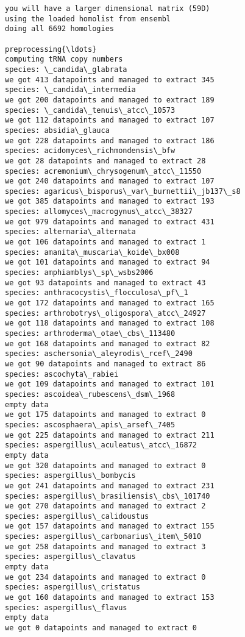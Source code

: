 \documentclass[11pt]{article}
\begin{document}
    \begin{Verbatim}[commandchars=\\\{\}]
you will have a larger dimensional matrix (59D)
using the loaded homolist from ensembl
doing all 6692 homologies
 
preprocessing{\ldots}
computing tRNA copy numbers
species: \_candida\_glabrata
we got 413 datapoints and managed to extract 345
species: \_candida\_intermedia
we got 200 datapoints and managed to extract 189
species: \_candida\_tenuis\_atcc\_10573
we got 112 datapoints and managed to extract 107
species: absidia\_glauca
we got 228 datapoints and managed to extract 186
species: acidomyces\_richmondensis\_bfw
we got 28 datapoints and managed to extract 28
species: acremonium\_chrysogenum\_atcc\_11550
we got 240 datapoints and managed to extract 107
species: agaricus\_bisporus\_var\_burnettii\_jb137\_s8
we got 385 datapoints and managed to extract 193
species: allomyces\_macrogynus\_atcc\_38327
we got 979 datapoints and managed to extract 431
species: alternaria\_alternata
we got 106 datapoints and managed to extract 1
species: amanita\_muscaria\_koide\_bx008
we got 101 datapoints and managed to extract 94
species: amphiamblys\_sp\_wsbs2006
we got 93 datapoints and managed to extract 43
species: anthracocystis\_flocculosa\_pf\_1
we got 172 datapoints and managed to extract 165
species: arthrobotrys\_oligospora\_atcc\_24927
we got 118 datapoints and managed to extract 108
species: arthroderma\_otae\_cbs\_113480
we got 168 datapoints and managed to extract 82
species: aschersonia\_aleyrodis\_rcef\_2490
we got 90 datapoints and managed to extract 86
species: ascochyta\_rabiei
we got 109 datapoints and managed to extract 101
species: ascoidea\_rubescens\_dsm\_1968
empty data
we got 175 datapoints and managed to extract 0
species: ascosphaera\_apis\_arsef\_7405
we got 225 datapoints and managed to extract 211
species: aspergillus\_aculeatus\_atcc\_16872
empty data
we got 320 datapoints and managed to extract 0
species: aspergillus\_bombycis
we got 241 datapoints and managed to extract 231
species: aspergillus\_brasiliensis\_cbs\_101740
we got 270 datapoints and managed to extract 2
species: aspergillus\_calidoustus
we got 157 datapoints and managed to extract 155
species: aspergillus\_carbonarius\_item\_5010
we got 258 datapoints and managed to extract 3
species: aspergillus\_clavatus
empty data
we got 234 datapoints and managed to extract 0
species: aspergillus\_cristatus
we got 160 datapoints and managed to extract 153
species: aspergillus\_flavus
empty data
we got 0 datapoints and managed to extract 0

\end{Verbatim}
\end{document}
